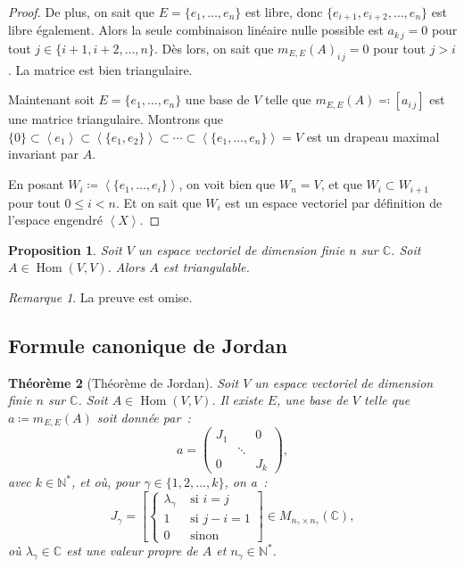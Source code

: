 \documentclass{article}
\DeclareMathOperator{\Hom}{Hom}
\newcommand{\N}{\mathbb N}
\newcommand{\C}{\mathbb C}
\newcommand{\eng}[1]{\left\langle#1\right\rangle}
\newcommand{\M}[3]{M_{#1 \times #2}(#3)}
\newtheorem{thm}{Théorème}[section]
\newtheorem{prp}[thm]{Proposition}
\theoremstyle{definition}
\theoremstyle{remark}
\newtheorem*{rmq}{Remarque}
\begin{document}
\begin{proof}
		De plus, on sait que $E = \{e_1, \dotsc, e_n\}$ est libre, donc $\{e_{i+1}, e_{i+2}, \dotsc, e_n\}$ est libre également. Alors la seule combinaison linéaire
		nulle possible est $a_{k\,j} = 0$ pour tout $j \in \{i+1, i+2, \ldots, n\}$. Dès lors, on sait que $m_{E, E}(A)_{i\,j} = 0$ pour tout $j > i$.
		La matrice est bien triangulaire.

		Maintenant soit $E = \{e_1, \dotsc, e_n\}$ une base de $V$ telle que $m_{E, E}(A) \eqqcolon [a_{i\,j}]$ est une matrice triangulaire. Montrons que
		$\{0\}  \subset \eng {e_1} \subset \eng {\{e_1, e_2\}} \subset \dotsb \subset \eng {\{e_1, \dotsc, e_n\}} = V$ est un drapeau maximal invariant par $A$.

		En posant $W_i \coloneqq \eng {\{e_1, \dotsc, e_i\}}$, on voit bien que $W_n = V$, et que $W_i \subset W_{i+1}$ pour tout $0 \leq i < n$. Et on sait que
		$W_i$ est un espace vectoriel par définition de l'espace engendré $\eng X$.
		\end{proof}

		\begin{prp} Soit $V$ un espace vectoriel de dimension finie $n$ sur $\C$. Soit $A \in \Hom(V,V)$. Alors $A$ est triangulable. \end{prp}

		\begin{rmq} La preuve est omise. \end{rmq}

	\subsection{Formule canonique de Jordan}
		\begin{thm}[Théorème de Jordan] Soit $V$ un espace vectoriel de dimension finie $n$ sur $\C$. Soit $A \in \Hom(V, V)$. Il existe $E$, une base de $V$
		telle que $a \coloneqq m_{E, E}(A)$ soit donnée par~:
		\[a = \begin{pmatrix}J_1 &  & 0 \\ & \ddots & \\0 & & J_k\end{pmatrix},\]
		avec $k \in \N^*$, et où, pour $\gamma \in \{1, 2, \ldots, k\}$, on a~:
		\[J_\gamma = \left[\begin{cases}\lambda_\gamma & \text{ si } i = j \\ 1 & \text{ si } j-i = 1 \\0 & \text{ sinon}\end{cases}\right] \in \M{n_\gamma}{n_\gamma}\C,\]
		où $\lambda_\gamma \in \C$ est une valeur propre de $A$ et $n_\gamma \in \N^*$.
		\end{thm}
\end{document}
